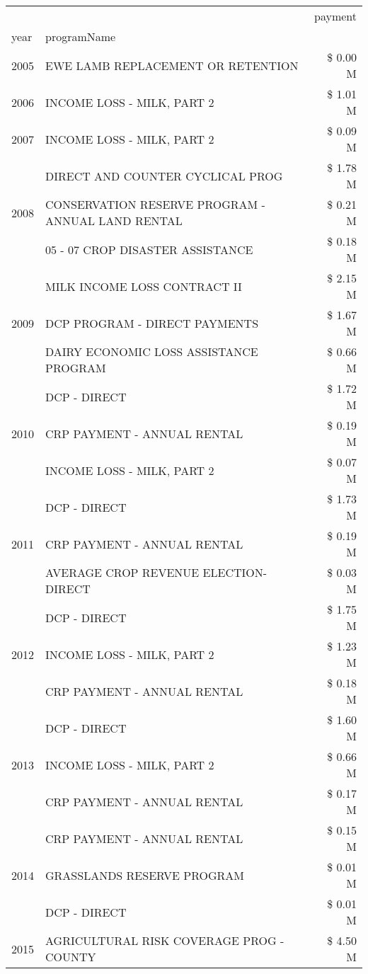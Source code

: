 \begin{tabular}{llr}
\toprule
 &  & payment \\
year & programName &  \\
\midrule
2005 & EWE LAMB REPLACEMENT OR RETENTION & \$ 0.00 M \\
\cline{1-3}
2006 & INCOME LOSS - MILK, PART 2 & \$ 1.01 M \\
\cline{1-3}
2007 & INCOME LOSS - MILK, PART 2 & \$ 0.09 M \\
\cline{1-3}
\multirow[t]{3}{*}{2008} & DIRECT AND COUNTER CYCLICAL PROG & \$ 1.78 M \\
 & CONSERVATION RESERVE PROGRAM - ANNUAL LAND RENTAL & \$ 0.21 M \\
 & 05 - 07 CROP DISASTER ASSISTANCE & \$ 0.18 M \\
\cline{1-3}
\multirow[t]{3}{*}{2009} & MILK INCOME LOSS CONTRACT II & \$ 2.15 M \\
 & DCP PROGRAM - DIRECT PAYMENTS & \$ 1.67 M \\
 & DAIRY ECONOMIC LOSS ASSISTANCE PROGRAM & \$ 0.66 M \\
\cline{1-3}
\multirow[t]{3}{*}{2010} & DCP - DIRECT & \$ 1.72 M \\
 & CRP PAYMENT - ANNUAL RENTAL & \$ 0.19 M \\
 & INCOME LOSS - MILK, PART 2 & \$ 0.07 M \\
\cline{1-3}
\multirow[t]{3}{*}{2011} & DCP - DIRECT & \$ 1.73 M \\
 & CRP PAYMENT - ANNUAL RENTAL & \$ 0.19 M \\
 & AVERAGE CROP REVENUE ELECTION-DIRECT & \$ 0.03 M \\
\cline{1-3}
\multirow[t]{3}{*}{2012} & DCP - DIRECT & \$ 1.75 M \\
 & INCOME LOSS - MILK, PART 2 & \$ 1.23 M \\
 & CRP PAYMENT - ANNUAL RENTAL & \$ 0.18 M \\
\cline{1-3}
\multirow[t]{3}{*}{2013} & DCP - DIRECT & \$ 1.60 M \\
 & INCOME LOSS - MILK, PART 2 & \$ 0.66 M \\
 & CRP PAYMENT - ANNUAL RENTAL & \$ 0.17 M \\
\cline{1-3}
\multirow[t]{3}{*}{2014} & CRP PAYMENT - ANNUAL RENTAL & \$ 0.15 M \\
 & GRASSLANDS RESERVE PROGRAM & \$ 0.01 M \\
 & DCP - DIRECT & \$ 0.01 M \\
\cline{1-3}
\multirow[t]{3}{*}{2015} & AGRICULTURAL RISK COVERAGE PROG - COUNTY & \$ 4.50 M \\

\end{tabular}
